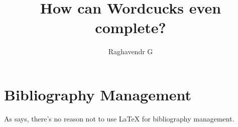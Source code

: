 \documentclass{article}
\author{Raghavendr G}
\title{How can Wordcucks even complete?}
\begin{document}
\maketitle

\section{Bibliography Management}

As \textcite{Raghavendr} says, there's no reason not to use \LaTeX{} for bibliography management.

\printbibliography
\end{document}
